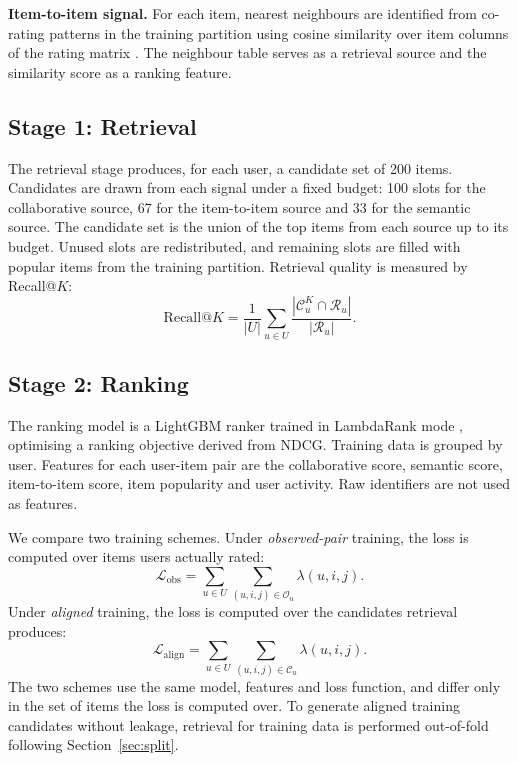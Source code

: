 \documentclass[10pt,twocolumn]{article}
\newcommand{\Lobs}{\mathcal{L}_{\mathrm{obs}}}
\newcommand{\Lalign}{\mathcal{L}_{\mathrm{align}}}
\begin{document}
\textbf{Item-to-item signal.} For each item, nearest neighbours are identified
from co-rating patterns in the training partition using cosine similarity over
item columns of the rating matrix \citep{sarwar2001item}. The neighbour table
serves as a retrieval source and the similarity score as a ranking feature.

\subsection{Stage 1: Retrieval}
\label{sec:retrieval}

The retrieval stage produces, for each user, a candidate set of 200 items.
Candidates are drawn from each signal under a fixed budget: 100 slots for the
collaborative source, 67 for the item-to-item source and 33 for the semantic
source. The candidate set is the union of the top items from each source up to
its budget. Unused slots are redistributed, and remaining slots are filled
with popular items from the training partition. Retrieval quality is measured
by Recall@$K$:
\begin{equation}
\mathrm{Recall}@K = \frac{1}{|U|}\sum_{u \in U}
\frac{\left|\mathcal{C}^{K}_{u} \cap \mathcal{R}_{u}\right|}
     {\left|\mathcal{R}_{u}\right|} .
\end{equation}

\subsection{Stage 2: Ranking}
\label{sec:ranking}

The ranking model is a LightGBM ranker \citep{ke2017lightgbm} trained in
LambdaRank mode \citep{burges2010ranknet}, optimising a ranking objective
derived from NDCG. Training data is grouped by user. Features for each
user-item pair are the collaborative score, semantic score, item-to-item
score, item popularity and user activity. Raw identifiers are not used as
features.

We compare two training schemes. Under \emph{observed-pair} training, the loss
is computed over items users actually rated:
\begin{equation}
\Lobs = \sum_{u \in U} \sum_{(u,i,j) \in \mathcal{O}_u} \lambda(u,i,j) .
\end{equation}
Under \emph{aligned} training, the loss is computed over the candidates
retrieval produces:
\begin{equation}
\Lalign = \sum_{u \in U} \sum_{(u,i,j) \in \mathcal{C}_u} \lambda(u,i,j) .
\end{equation}
The two schemes use the same model, features and loss function, and differ
only in the set of items the loss is computed over. To generate aligned
training candidates without leakage, retrieval for training data is performed
out-of-fold following Section~\ref{sec:split}.
\end{document}
